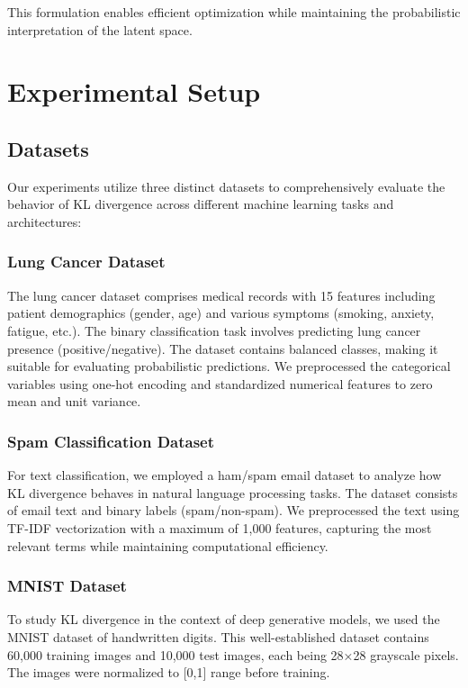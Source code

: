 \documentclass[preprint,12pt]{elsarticle}
\begin{document}
This formulation enables efficient optimization while maintaining the probabilistic interpretation of the latent space.

\section{Experimental Setup}
\subsection{Datasets}
Our experiments utilize three distinct datasets to comprehensively evaluate the behavior of KL divergence across different machine learning tasks and architectures:

\subsubsection{Lung Cancer Dataset}
The lung cancer dataset comprises medical records with 15 features including patient demographics (gender, age) and various symptoms (smoking, anxiety, fatigue, etc.). The binary classification task involves predicting lung cancer presence (positive/negative). The dataset contains balanced classes, making it suitable for evaluating probabilistic predictions. We preprocessed the categorical variables using one-hot encoding and standardized numerical features to zero mean and unit variance.

\subsubsection{Spam Classification Dataset}
For text classification, we employed a ham/spam email dataset to analyze how KL divergence behaves in natural language processing tasks. The dataset consists of email text and binary labels (spam/non-spam). We preprocessed the text using TF-IDF vectorization with a maximum of 1,000 features, capturing the most relevant terms while maintaining computational efficiency.

\subsubsection{MNIST Dataset}
To study KL divergence in the context of deep generative models, we used the MNIST dataset of handwritten digits. This well-established dataset contains 60,000 training images and 10,000 test images, each being 28×28 grayscale pixels. The images were normalized to [0,1] range before training.
\end{document}
